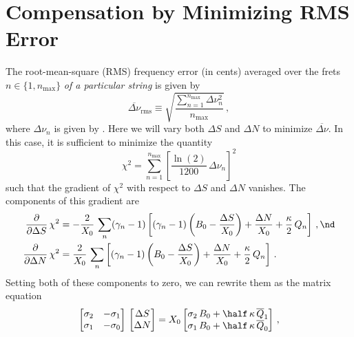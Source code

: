 %
%
%

 \section{Compensation by Minimizing RMS Error\label{app:rms}}

The root-mean-square (RMS) frequency error (in cents) averaged over the frets $n \in \{1, n_\text{max}\}$ \emph{of a particular string} is given by
 \begin{equation}\label{eqn:rms_def}
\overline{\Delta \nu}_\text{rms} \equiv \sqrt{\frac{\sum_{n = 1}^{n_\text{max}} \Delta \nu_n^2}{n_\text{max}}}\, ,
 \end{equation}
where $\Delta \nu_n$ is given by . Here we will vary both $\Delta S$ and $\Delta N$ to minimize $\overline{\Delta \nu}$. In this case, it is sufficient to minimize the quantity
 \begin{equation}\label{eqn:chi2_def}
\chi^2 = \sum_{n = 1}^{n_\text{max}} \left[\frac{\ln(2)}{1200}\, \Delta \nu_n\right]^2
 \end{equation}
such that the gradient of $\chi^2$ with respect to $\Delta S$ and $\Delta N$ vanishes. The components of this gradient are
 \begin{subequations}\label{chi2_grad}
 \begin{align}
\frac{\partial}{\partial \Delta S}\, \chi^2 &= -\frac{2}{X_0}\, \sum_n (\gamma_n - 1)\left[ (\gamma_n - 1) \left(B_0 - \frac{\Delta S}{X_0}\right) + \frac{\Delta N}{X_0} + \frac{\kappa}{2}\, Q_n \right]\, , \nd \\
\frac{\partial}{\partial \Delta N}\, \chi^2 &= \frac{2}{X_0}\, \sum_n \left[ (\gamma_n - 1) \left(B_0 - \frac{\Delta S}{X_0}\right) + \frac{\Delta N}{X_0} + \frac{\kappa}{2}\, Q_n \right]\, .
 \end{align}
 \end{subequations}
Setting both of these components to zero, we can rewrite them as the matrix equation
 \begin{equation} \label{eqn:rms_mat}
\begin{bmatrix}
  \sigma_2 & -\sigma_1 \\
  \sigma_1 & -\sigma_0
\end{bmatrix}\,
\begin{bmatrix}
  \Delta S \\
  \Delta N
\end{bmatrix} = X_0
\begin{bmatrix}
  \sigma_2\, B_0 +  \half\, \kappa\, \overline{Q}_1 \\
  \sigma_1\, B_0 +  \half\, \kappa\, \overline{Q}_0
\end{bmatrix}\, ,
 \end{equation}
